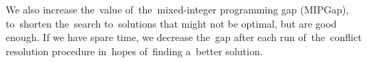 \begin{minipage}{\textwidth}
We also increase the~value of~the~mixed-integer programming gap (MIPGap)\cite{gurobi}, to~shorten the~search to~solutions that might not be optimal, but are good enough. If we have spare time, we decrease the~gap after each run of~the~conflict resolution procedure in~hopes of~finding a~better solution.
\end{minipage}


